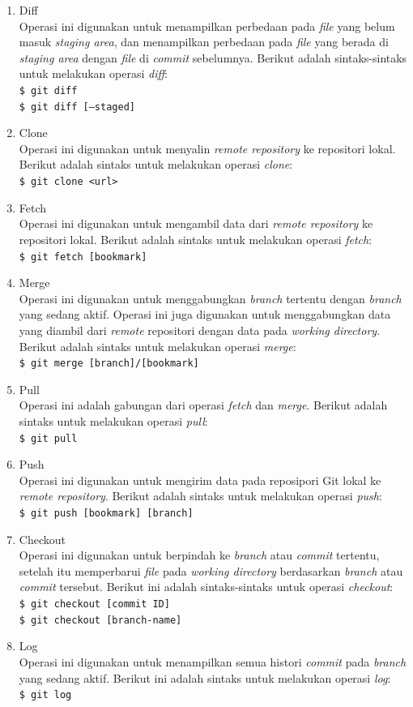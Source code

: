 \begin{enumerate}
\item Diff\\
Operasi ini digunakan untuk menampilkan perbedaan pada \textit{file} yang belum masuk \textit{staging area}, dan menampilkan perbedaan pada \textit{file} yang berada di \textit{staging area} dengan \textit{file} di \textit{commit} sebelumnya.  Berikut adalah sintaks-sintaks untuk melakukan operasi \textit{diff}:\\
\texttt{\$ git diff} \\
\texttt{\$ git diff [--staged]}\\
\item Clone\\
Operasi ini digunakan untuk menyalin \textit{remote repository} ke repositori lokal. Berikut adalah sintaks untuk melakukan operasi \textit{clone}:\\
\texttt{\$ git clone <url>}
\item Fetch\\
Operasi ini digunakan untuk mengambil data dari \textit{remote repository} ke repositori lokal. Berikut adalah sintaks untuk melakukan operasi \textit{fetch}:\\
\texttt{\$ git fetch [bookmark]}
\item Merge\\
Operasi ini digunakan untuk menggabungkan \textit{branch} tertentu dengan \textit{branch} yang sedang aktif. Operasi ini juga digunakan untuk menggabungkan data yang diambil dari \textit{remote} repositori dengan data pada \textit{working directory}. Berikut adalah sintaks untuk melakukan operasi \textit{merge}:\\
\texttt{\$ git merge [branch]/[bookmark]}
\item Pull\\
Operasi ini adalah gabungan dari operasi \textit{fetch} dan \textit{merge}. Berikut adalah sintaks untuk melakukan operasi \textit{pull}:\\
\texttt{\$ git pull }
\item Push\\
Operasi ini digunakan untuk mengirim data pada reposipori Git lokal ke \textit{remote repository}.
Berikut adalah sintaks untuk melakukan operasi \textit{push}:\\
\texttt{\$ git push [bookmark] [branch]}
\item Checkout\\
Operasi ini digunakan untuk berpindah ke \textit{branch} atau \textit{commit} tertentu, setelah itu memperbarui \textit{file} pada \textit{working directory} berdasarkan \textit{branch} atau \textit{commit} tersebut. Berikut ini adalah sintaks-sintaks untuk operasi \textit{checkout}:\\
\texttt{\$ git checkout [commit ID]}\\
\texttt{\$ git checkout [branch-name]}
\item Log\\
Operasi ini digunakan untuk menampilkan semua histori \textit{commit} pada \textit{branch} yang sedang aktif. Berikut ini adalah sintaks untuk melakukan operasi \textit{log}:\\
\texttt{\$ git log}


\end{enumerate}
